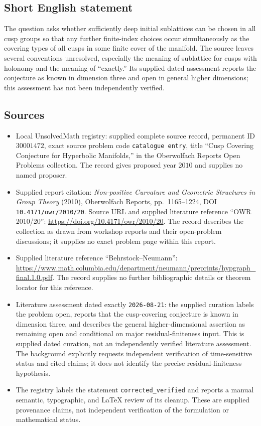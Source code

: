 \documentclass[11pt]{article}
\begin{document}
\subsection{Short English statement}
The question asks whether sufficiently deep initial sublattices can be chosen in all cusp groups so that any further finite-index choices occur simultaneously as the covering types of all cusps in some finite cover of the manifold. The source leaves several conventions unresolved, especially the meaning of sublattice for cusps with holonomy and the meaning of ``exactly.'' Its supplied dated assessment reports the conjecture as known in dimension three and open in general higher dimensions; this assessment has not been independently verified.
\subsection{Sources}
\begin{itemize}
\item Local UnsolvedMath registry: supplied complete source record, permanent ID \(30001472\), exact source problem code \texttt{catalogue entry}, title ``Cusp Covering Conjecture for Hyperbolic Manifolds,'' in the Oberwolfach Reports Open Problems collection. The record gives proposed year \(2010\) and supplies no named proposer.
\item Supplied report citation: \emph{Non-positive Curvature and Geometric Structures in Group Theory} (2010), Oberwolfach Reports, pp.\ 1165--1224, DOI \texttt{10.4171/owr/2010/20}. Source URL and supplied literature reference ``OWR 2010/20'': \url{https://doi.org/10.4171/owr/2010/20}. The record describes the collection as drawn from workshop reports and their open-problem discussions; it supplies no exact problem page within this report.
\item Supplied literature reference ``Behrstock--Neumann'': \url{https://www.math.columbia.edu/department/neumann/preprints/hypgraph_final.1.0.pdf}. The record supplies no further bibliographic details or theorem locator for this reference.
\item Literature assessment dated exactly \texttt{2026-08-21}: the supplied curation labels the problem open, reports that the cusp-covering conjecture is known in dimension three, and describes the general higher-dimensional assertion as remaining open and conditional on major residual-finiteness input. This is supplied dated curation, not an independently verified literature assessment. The background explicitly requests independent verification of time-sensitive status and cited claims; it does not identify the precise residual-finiteness hypothesis.
\item The registry labels the statement \texttt{corrected\_verified} and reports a manual semantic, typographic, and LaTeX review of its cleanup. These are supplied provenance claims, not independent verification of the formulation or mathematical status.
\end{itemize}
\end{document}

